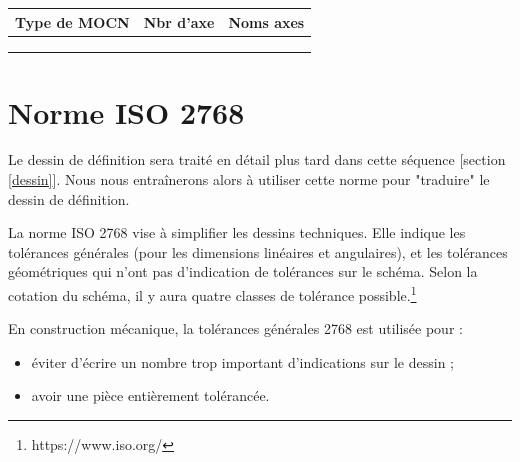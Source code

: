 \documentclass[
	11pt, %
	fleqn, %
	a4paper, %
]{LegrandOrangeBook}
\begin{document}
\begin{table}[H] %
	\centering %
	\begin{tabular}{L{0.15\textwidth} R{0.15\textwidth} R{0.15\textwidth}} %
		\toprule
		\textbf{Type de MOCN} & \textbf{Nbr d'axe} & \textbf{Noms axes}\\
		\midrule
		  &  &  \\
		  &  &  \\
		  &  &  \\
		\bottomrule
	\end{tabular}
	\label{tab:example} %
\end{table}




\section{Norme ISO 2768}

\begin{remark}
    Le dessin de définition sera traité en détail plus tard dans cette séquence [section \ref{dessin}]. Nous nous entraînerons alors à utiliser cette norme pour "traduire" le dessin de définition.
\end{remark}


\begin{definition}
    La norme ISO 2768 vise à simplifier les dessins techniques. Elle indique les tolérances générales (pour les dimensions linéaires et angulaires), et les tolérances géométriques qui n'ont pas d'indication de tolérances sur le schéma. Selon la cotation du schéma, il y aura quatre classes de tolérance possible.\footnote{https://www.iso.org/} \\
\end{definition}


En	construction	mécanique,	la	tolérances	générales 2768	est	utilisée pour	:\\
\begin{itemize}
    \item éviter d'écrire un nombre trop important	d'indications sur le dessin ;
    \item avoir	une	pièce entièrement tolérancée.\\
\end{itemize}
\end{document}
